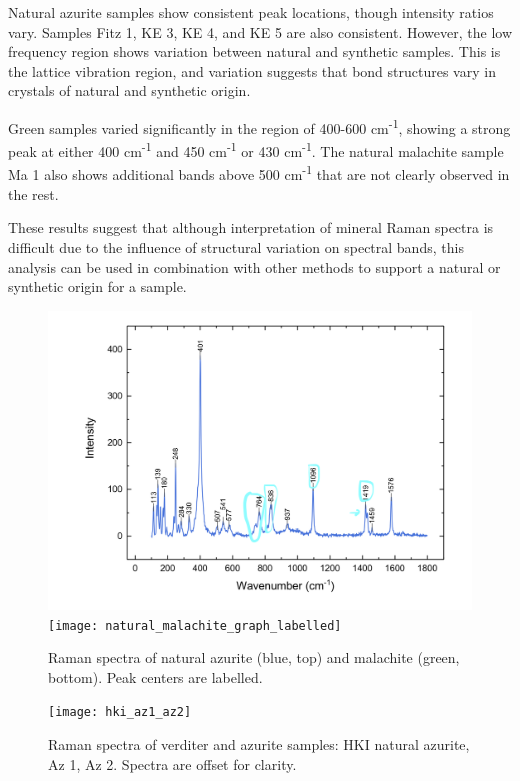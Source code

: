 Natural azurite samples show consistent peak locations, though intensity ratios vary. Samples Fitz 1, KE 3, KE 4, and KE 5 are also consistent. However, the low frequency region shows variation between natural and synthetic samples. This is the lattice vibration region, and variation suggests that bond structures vary in crystals of natural and synthetic origin.

Green samples varied significantly in the region of 400-600 cm\textsuperscript{-1}, showing a strong peak at either 400 cm\textsuperscript{-1} and 450 cm\textsuperscript{-1} or 430 cm\textsuperscript{-1}. The natural malachite sample Ma 1 also shows additional bands above 500 cm\textsuperscript{-1} that are not clearly observed in the rest. 

These results suggest that although interpretation of mineral Raman spectra is difficult due to the influence of structural variation on spectral bands, this analysis can be used in combination with other methods to support a natural or synthetic origin for a sample. 

\begin{figure}[H]
\centering
\begin{minipage}[t]{\linewidth}
  \centering
  \includegraphics[width=0.9\linewidth]{az1_blue_withlabels}
\hfill
\texttt{[image: natural\_malachite\_graph\_labelled]}
\hfill
\end{minipage}
\caption[Raman spectra of natural azurite and malachite, peak centers labelled.]{Raman spectra of natural azurite (blue, top) and malachite (green, bottom). Peak centers are labelled.}
\label{fig:label_raman}
\end{figure}

\begin{figure}[H]
\centering
  \texttt{[image: hki\_az1\_az2]}
\caption[Raman spectra of blue samples.]{Raman spectra of verditer and azurite samples: HKI natural azurite, Az 1, Az 2. Spectra are offset for clarity.}
\label{fig:blue_comparison1}
\end{figure}

